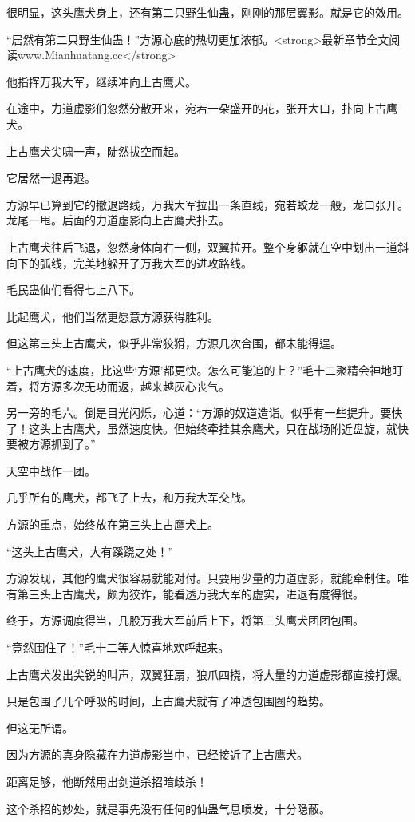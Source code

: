 \begin{this_body}
很明显，这头鹰犬身上，还有第二只野生仙蛊，刚刚的那层翼影。就是它的效用。

“居然有第二只野生仙蛊！”方源心底的热切更加浓郁。<strong>最新章节全文阅读www.Mianhuatang.cc</strong>

他指挥万我大军，继续冲向上古鹰犬。

在途中，力道虚影们忽然分散开来，宛若一朵盛开的花，张开大口，扑向上古鹰犬。

上古鹰犬尖啸一声，陡然拔空而起。

它居然一退再退。

方源早已算到它的撤退路线，万我大军拉出一条直线，宛若蛟龙一般，龙口张开。龙尾一甩。后面的力道虚影向上古鹰犬扑去。

上古鹰犬往后飞退，忽然身体向右一侧，双翼拉开。整个身躯就在空中划出一道斜向下的弧线，完美地躲开了万我大军的进攻路线。

毛民蛊仙们看得七上八下。

比起鹰犬，他们当然更愿意方源获得胜利。

但这第三头上古鹰犬，似乎非常狡猾，方源几次合围，都未能得逞。

“上古鹰犬的速度，比这些‘方源’都更快。怎么可能追的上？”毛十二聚精会神地盯着，将方源多次无功而返，越来越灰心丧气。

另一旁的毛六。倒是目光闪烁，心道：“方源的奴道造诣。似乎有一些提升。要快了！这头上古鹰犬，虽然速度快。但始终牵挂其余鹰犬，只在战场附近盘旋，就快要被方源抓到了。”

天空中战作一团。

几乎所有的鹰犬，都飞了上去，和万我大军交战。

方源的重点，始终放在第三头上古鹰犬上。

“这头上古鹰犬，大有蹊跷之处！”

方源发现，其他的鹰犬很容易就能对付。只要用少量的力道虚影，就能牵制住。唯有第三头上古鹰犬，颇为狡诈，能看透万我大军的虚实，进退有度得很。

终于，方源调度得当，几股万我大军前后上下，将第三头鹰犬团团包围。

“竟然围住了！”毛十二等人惊喜地欢呼起来。

上古鹰犬发出尖锐的叫声，双翼狂扇，狼爪四挠，将大量的力道虚影都直接打爆。

只是包围了几个呼吸的时间，上古鹰犬就有了冲透包围圈的趋势。

但这无所谓。

因为方源的真身隐藏在力道虚影当中，已经接近了上古鹰犬。

距离足够，他断然用出剑道杀招暗歧杀！

这个杀招的妙处，就是事先没有任何的仙蛊气息喷发，十分隐蔽。


\end{this_body}
